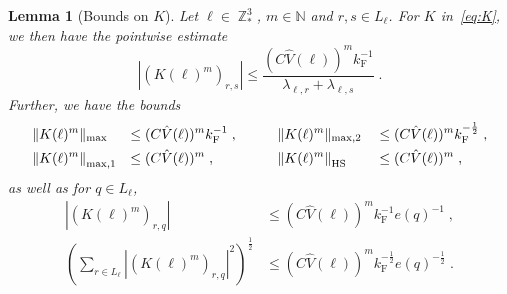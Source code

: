 \documentclass[12pt,a4paper]{article}
\numberwithin{equation}{section}
\newcommand{\1}{\mathbb{I}}
\newcommand{\F}{\mathrm{F}}
\newcommand{\HS}{\mathrm{HS}}
\DeclareMathOperator{\Z}{\mathbb{Z}}
\newcommand{\half}{\frac{1}{2}}
\newcommand{\normmaxi}[1]{\norm{#1}_{\mathrm{max,1}}}
\theoremstyle{plain}
\newtheorem{lemma}[theorem]{Lemma}
\theoremstyle{definition}
\theoremstyle{remark}
\theoremstyle{plain}
\theoremstyle{definition}
\theoremstyle{remark}
\begin{document}
\begin{lemma}[Bounds on $ K $]\label{lem:normsk}
Let $ \ell \in \Z^3_* $, $ m \in \mathbb{N} $ and $ r,s \in L_\ell $. For $ K $ in~\eqref{eq:K}, we then have the pointwise estimate
\begin{equation} \label{eq:K_element_bounds}
	|(K(\ell)^m)_{r,s}|
	\le \frac{(C \hat{V}(\ell))^m k_{\F}^{-1}}{\lambda_{\ell,r} + \lambda_{\ell,s}} \;.
\end{equation}
Further, we have the bounds
\begin{equation} \label{eq:K_max_bounds}
\begin{aligned}
	&\Vert K(\ell)^m \Vert_{\max}
	&\le \; &(C \hat{V}(\ell))^m k_{\F}^{-1} \;, \qquad
	&&\Vert K(\ell)^m \Vert_{\max,2}
	&&\le (C \hat{V}(\ell))^m k_{\F}^{-\half} \;, \\
	&\normmaxi{K(\ell)^m}
	&\le \; &(C \hat{V}(\ell))^m \;, \qquad
	&&\norm{K(\ell)^m}_{\HS}
	&&\le (C \hat{V}(\ell))^m \;,
\end{aligned} 
\end{equation}
as well as for $ q \in L_\ell $,
\begin{equation} \label{eq:e(q)_extraction_bounds}
\begin{split}
	|(K(\ell)^m)_{r,q}|
	& \le (C \hat{V}(\ell))^m k_{\F}^{-1} e(q)^{-1} \;, \\
	\left( \sum_{r \in L_\ell} |(K(\ell)^m)_{r,q}|^2 \right)^{\half}
	& \le (C \hat{V}(\ell))^m k_{\F}^{-\half} e(q)^{-\half} \;.
\end{split}
\end{equation}
\end{lemma}
\end{document}
